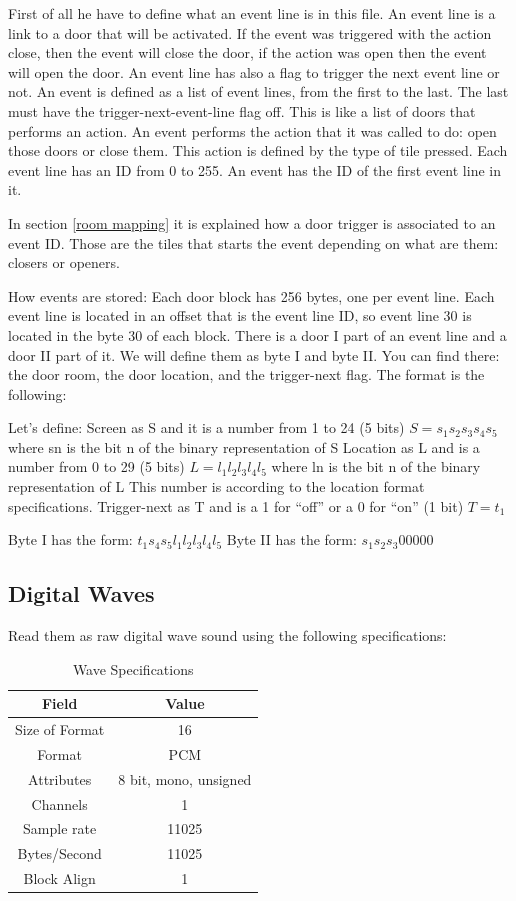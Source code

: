 \documentclass{article}
\begin{document}
 First of all he have to define what an event line is in this file. An
 event line is a link to a door that will be activated. If the event was
 triggered with the action close, then the event will close the door, if
 the action was open then the event will open the door. An event line has
 also a flag to  trigger the next event line or not.
 An event is defined as a list of event lines, from the first to the last.
 The last must have the trigger-next-event-line flag off. This is like a
 list of doors that performs an action.
 An event performs the action that it was called to do: open those doors or
 close them. This action is defined by the type of tile pressed.
 Each event line has an ID from 0 to 255. An event has the ID of the first
 event line in it.

 In section \ref{room mapping} it is explained how a door trigger is associated to an
 event ID. Those are the tiles that starts the event depending on what are
 them: closers or openers.

 How events are stored:
 Each door block has 256 bytes, one per event line. Each event line is
 located in an offset that is the event line ID, so event line 30 is
 located in the byte 30 of each block.
 There is a door I part of an event line and a door II part of it. We will
 define them as byte I and byte II.
 You can find there: the door room, the door location, and the
 trigger-next flag. The format is the following:

 Let's define:
  Screen as S and it is a number from 1 to 24 (5 bits)
   $S = s_1 s_2 s_3 s_4 s_5$
    where sn is the bit n of the binary representation of S
  Location as L and is a number from 0 to 29 (5 bits)
   $L = l_1 l_2 l_3 l_4 l_5$
    where ln is the bit n of the binary representation of L
   This number is according to the location format specifications.
  Trigger-next as T and is a 1 for ``off'' or a 0 for ``on'' (1 bit)
   $T = t_1$

 Byte I  has the form: $t_1 s_4 s_5 l_1 l_2 l_3 l_4 l_5$
 Byte II has the form: $s_1 s_2 s_3  0  0  0  0  0$

\subsection{Digital Waves}
 Read them as raw digital wave sound using the following specifications:

\begin{table}
\begin{tabular}{cc}
\hline
  Field&Value\\
\hline
  Size of Format& 16 \\
  Format&         PCM \\
  Attributes&     8 bit, mono, unsigned \\
  Channels&       1 \\
  Sample rate&    11025 \\
  Bytes/Second&   11025 \\
  Block Align&    1 \\
\hline
\end{tabular}
\caption{Wave Specifications}
\label{wave specs}
\end{table}
\end{document}
